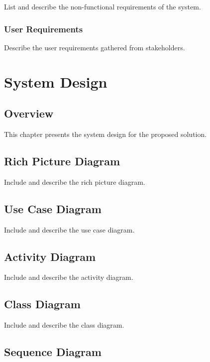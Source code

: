 \documentclass[
]{fypStandard}
\begin{document}
List and describe the non-functional requirements of the system.

\subsection{User Requirements}\label{user-requirements}

Describe the user requirements gathered from stakeholders.

\chapter{System Design}\label{system-design}

\section{Overview}\label{overview-3}

This chapter presents the system design for the proposed solution.

\section{Rich Picture Diagram}\label{rich-picture-diagram}

Include and describe the rich picture diagram.

\section{Use Case Diagram}\label{use-case-diagram}

Include and describe the use case diagram.

\section{Activity Diagram}\label{activity-diagram}

Include and describe the activity diagram.

\section{Class Diagram}\label{class-diagram}

Include and describe the class diagram.

\section{Sequence Diagram}\label{sequence-diagram}
\end{document}
